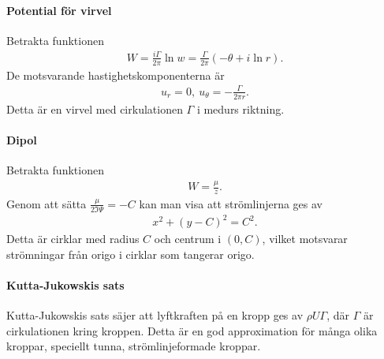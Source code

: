 \paragraph{Potential för virvel}
Betrakta funktionen
\begin{align*}
	W = \frac{i\Gamma}{2\pi}\ln{w} = \frac{\Gamma}{2\pi}(-\theta + i\ln{r}).
\end{align*}
De motsvarande hastighetskomponenterna är
\begin{align*}
	u_{r} = 0,\ u_{\theta} = -\frac{\Gamma}{2\pi r}.
\end{align*}
Detta är en virvel med cirkulationen $\Gamma$ i medurs riktning.

\paragraph{Dipol}
Betrakta funktionen
\begin{align*}
	W = \frac{\mu}{z}.
\end{align*}
Genom att sätta $\frac{\mu}{2\Im{\Psi}} = -C$ kan man visa att strömlinjerna ges av
\begin{align*}
	x^{2} + (y - C)^{2} = C^{2}.
\end{align*}
Detta är cirklar med radius $C$ och centrum i $(0, C)$, vilket motsvarar strömningar från origo i cirklar som tangerar origo.

\paragraph{Kutta-Jukowskis sats}
Kutta-Jukowskis sats säjer att lyftkraften på en kropp ges av $\rho U\Gamma$, där $\Gamma$ är cirkulationen kring kroppen. Detta är en god approximation för många olika kroppar, speciellt tunna, strömlinjeformade kroppar.